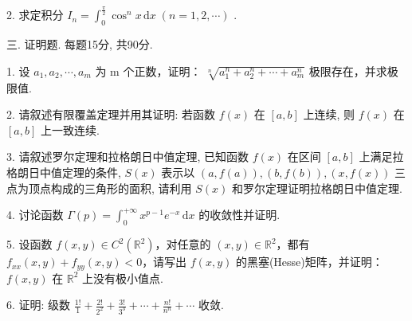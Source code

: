 \documentclass{examcollection}
\begin{document}
{\begin{minipage}{\textwidth}
2. 求定积分  $I_{n}=\int_{0}^{\frac{\pi}{2}}\cos^{n}x\,\mathrm{d}x\;(n=1,2,\cdots)$ .\par
三. 证明题. 每题15分, 共90分.\par
1. 设  $a_{1}, a_{2}, \cdots, a_{m}$  为 m 个正数，证明： $\sqrt[n]{a_{1}^{n} + a_{2}^{n} + \cdots + a_{m}^{n}}$  极限存在，并求极限值.\par
2. 请叙述有限覆盖定理并用其证明: 若函数 $f(x)$ 在 $[a, b]$ 上连续, 则 $f(x)$ 在 $[a, b]$ 上一致连续.\par
3. 请叙述罗尔定理和拉格朗日中值定理, 已知函数 $f(x)$ 在区间 $[a, b]$ 上满足拉格朗日中值定理的条件, $S(x)$ 表示以 $(a, f(a)), (b, f(b)), (x, f(x))$ 三点为顶点构成的三角形的面积, 请利用 $S(x)$ 和罗尔定理证明拉格朗日中值定理.\par
4. 讨论函数 $\Gamma(p) = \int_{0}^{+\infty} x^{p-1} e^{-x} \, \mathrm{d}x$ 的收敛性并证明.\par
5. 设函数 $f(x, y) \in C^2(\mathbb{R}^2)$，对任意的 $(x, y) \in \mathbb{R}^2$，都有 $f_{xx}(x, y) + f_{yy}(x, y) < 0$，请写出 $f(x, y)$ 的黑塞(Hesse)矩阵，并证明：$f(x, y)$ 在 $\mathbb{R}^2$ 上没有极小值点.\par
6. 证明: 级数 $\frac{1!}{1} + \frac{2!}{2^2} + \frac{3!}{3^3} + \cdots + \frac{n!}{n^n} + \cdots$ 收敛.\par
\end{minipage}}
\ifdim\dimexpr\ht\proofbox+\dp\proofbox\relax>\textheight
\noindent\resizebox{!}{\textheight}{\usebox{\proofbox}}\else\noindent\usebox{\proofbox}\fi\clearpage
\end{document}
